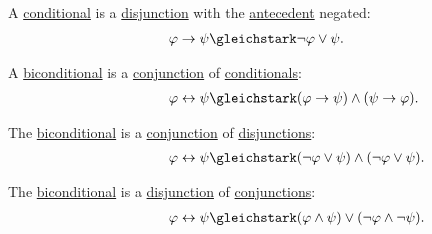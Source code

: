 \begin{proposition}
\begin{thmenum}
     A \hyperref[def:propositional_language/connectives/conditional]{conditional} is a \hyperref[def:propositional_language/connectives/disjunction]{disjunction} with the \hyperref[def:material_implication/antecedent]{antecedent} negated:
    \begin{equation}\label{eq:thm:boolean_equivalences/conditional_as_disjunction}
      \begin{split}
        \mathllap{\varphi \rightarrow \psi} &\gleichstark \mathrlap{ \neg \varphi \vee \psi. }
      \end{split}
    \end{equation}

     A \hyperref[def:propositional_language/connectives/biconditional]{biconditional} is a \hyperref[def:propositional_language/connectives/conjunction]{conjunction} of \hyperref[def:propositional_language/connectives]{conditionals}:
    \begin{equation}\label{eq:thm:boolean_equivalences/biconditional_via_conditionals}
      \begin{split}
        \mathllap{\varphi \leftrightarrow \psi} &\gleichstark \mathrlap{(\varphi \rightarrow \psi) \wedge (\psi \rightarrow \varphi).}
      \end{split}
    \end{equation}

     The \hyperref[def:propositional_language/connectives/biconditional]{biconditional} is a \hyperref[def:propositional_language/connectives/disjunction]{conjunction} of \hyperref[def:propositional_language/connectives/conjunction]{disjunctions}:
    \begin{equation}\label{eq:thm:boolean_equivalences/biconditional_as_conjunction}
      \begin{split}
        \mathllap{\varphi \leftrightarrow \psi} &\gleichstark \mathrlap{(\neg \varphi \vee \psi) \wedge (\neg \varphi \vee \psi).}
      \end{split}
    \end{equation}

     The \hyperref[def:propositional_language/connectives/biconditional]{biconditional} is a \hyperref[def:propositional_language/connectives/disjunction]{disjunction} of \hyperref[def:propositional_language/connectives/conjunction]{conjunctions}:
    \begin{equation}\label{eq:thm:boolean_equivalences/biconditional_as_disjunction}
      \begin{split}
        \mathllap{\varphi \leftrightarrow \psi} &\gleichstark \mathrlap{(\varphi \wedge \psi) \vee (\neg \varphi \wedge \neg \psi).}
      \end{split}
    \end{equation}


\end{thmenum}
\end{proposition}
